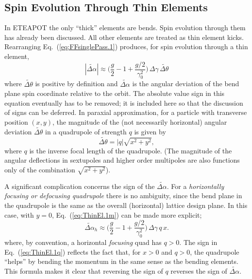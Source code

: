 \documentclass[]{article}
\begin{document}
\subsection{Spin Evolution Through Thin Elements}
In ETEAPOT the only ``thick'' elements are bends. Spin
evolution through them has already been discussed.
All other elements are treated as thin element kicks. 
Rearranging
Eq.~(\ref{eq:FFsinglePass.1}) produces, for spin evolution
through a thin element,
%
\begin{equation}
\boxed{
|\widetilde{\Delta\alpha}|
 \approx
\bigg(\frac{g}{2} - 1 + \frac{g/2}{\gamma_0^2}\bigg)\,
\Delta\gamma\,
\widetilde{\Delta\theta}
\label{eq:ThinEl.1m}
}
\end{equation}
%
where $\widetilde{\Delta\theta}$ is positive by definition 
and $\widetilde{\Delta\alpha}$ is the angular deviation
of the bend plane spin coordinate relative to the orbit.
The absolute value sign in this equation eventually has
to be removed; it is included here so that the discussion
of signs can be deferred. In paraxial approximation,
for a particle with transverse position $(x,y)$, the 
magnitude of the (not necessarily horizontal) angular deviation 
$\widetilde{\Delta\theta}$ in a quadrupole of strength $q$
is given by
%
\begin{equation}
\widetilde{\Delta\theta} = |q|\sqrt{x^2+y^2},
\label{eq:ThinEl.1p}
\end{equation}
%
where $q$ is the inverse focal length of the quadrupole.
(The magnitude of the angular deflections in sextupoles and 
higher order multipoles are also functions only of the
combination $\sqrt{x^2+y^2}$).

A significant complication concerns the sign of the 
$\widetilde{\Delta\alpha}$. For a 
\emph{horizontally focusing or defocusing quadrupole} 
there is no ambiguity, since the bend plane
in the quadrupole is the same as the overall (horizontal)
lattice design plane. In this case, with $y=0$,
Eq.~(\ref{eq:ThinEl.1m}) can be made more explicit;
%
\begin{equation}
\widetilde{\Delta\alpha}_h
 \approx
\bigg(\frac{g}{2} - 1 + \frac{g/2}{\gamma_0^2}\bigg)\,
\Delta\gamma\,
q\,x.
\label{eq:ThinEl.1q}
\end{equation}
%
where, by convention, a horizontal \emph{focusing} quad has $q>0$. 
The sign in Eq.~(\ref{eq:ThinEl.1q}) reflects the fact that, for 
$x>0$ and $q>0$, the quadrupole ``helps'' by 
bending the momentum in the same sense as the bending elements.
This formula makes it clear that reversing the sign of $q$
reverses the sign of $\widetilde{\Delta\alpha}$.
\end{document}
